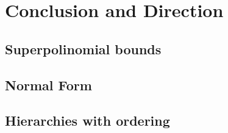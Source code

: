 \chapter{Conclusion and Direction}\label{ch:conclusion-and-direction}

\section{Superpolinomial bounds}

\section{Normal Form}

\section{Hierarchies with ordering}